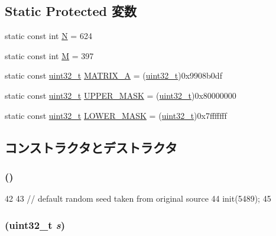 \subsection*{Static Protected 変数}
\begin{DoxyCompactItemize}
\item 
static const int \hyperlink{classRandom_ab2b6b0c222cd1ce70d6a831f57241e59}{N} = 624
\item 
static const int \hyperlink{classRandom_a9edc6895d567e0ddcdd3cc20df3f3b4b}{M} = 397
\item 
static const \hyperlink{Type_8hh_a435d1572bf3f880d55459d9805097f62}{uint32\_\-t} \hyperlink{classRandom_ad7a9963baa43ec4c81dcf60abe7ab583}{MATRIX\_\-A} = (\hyperlink{Type_8hh_a435d1572bf3f880d55459d9805097f62}{uint32\_\-t})0x9908b0df
\item 
static const \hyperlink{Type_8hh_a435d1572bf3f880d55459d9805097f62}{uint32\_\-t} \hyperlink{classRandom_af886d2b26feab424eef23b7b26896ecc}{UPPER\_\-MASK} = (\hyperlink{Type_8hh_a435d1572bf3f880d55459d9805097f62}{uint32\_\-t})0x80000000
\item 
static const \hyperlink{Type_8hh_a435d1572bf3f880d55459d9805097f62}{uint32\_\-t} \hyperlink{classRandom_a121b964de80b4462fdb70f6aec06e71b}{LOWER\_\-MASK} = (\hyperlink{Type_8hh_a435d1572bf3f880d55459d9805097f62}{uint32\_\-t})0x7fffffff
\end{DoxyCompactItemize}


\subsection{コンストラクタとデストラクタ}
\hypertarget{classRandom_aa0cd23a16025cfeef7b8810eeb2a5d36}{
\subsubsection[{Random}]{ ()}}
\label{classRandom_aa0cd23a16025cfeef7b8810eeb2a5d36}



\begin{DoxyCode}
42 {
43     // default random seed taken from original source
44     init(5489);
45 }
\end{DoxyCode}
\hypertarget{classRandom_ad75ec3e16831c6c1170ac666c5ee1cb3}{
\subsubsection[{Random}]{ ({\bf uint32\_\-t} {\em s})}}
\label{classRandom_ad75ec3e16831c6c1170ac666c5ee1cb3}



